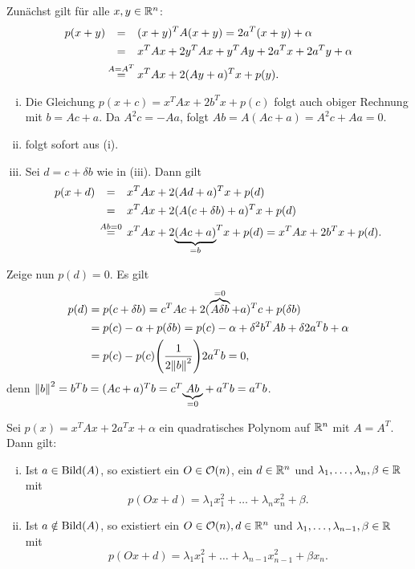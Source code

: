 \begin{beweis}
	Zunächst gilt für alle $x,y\in \mathbb{R}^n$:
	\begin{align*}
		p(x+y) &\stack{}{=} (x+y)^T A (x+y) = 2a^T(x+y) + \alpha \\
		&\stack{}{=} x^T Ax + 2y^T Ax + y^T Ay + 2a^Tx + 2a^Ty + \alpha \\
		&\stack{A=A^T}{=} x^TAx + 2(Ay + a)^Tx + p(y).
	\end{align*}
	\begin{enumerate}[(i)]
		\item Die Gleichung $p(x+c) = x^TAx + 2b^Tx + p(c)$ folgt auch obiger Rechnung mit $b = Ac+a$.
		Da $A^2c = -Aa$, folgt $Ab = A(Ac + a) = A^2c + Aa = 0$.
		\item folgt sofort aus (i).
		\item Sei $d = c + \delta b$ wie in (iii).
		Dann gilt
		\begin{align*}
			p(x+d)& \stack{}{=} x^TAx + 2(Ad+a)^T x + p(d) \\
			&\stack{}{=} x^TAx + 2(A(c+\delta b) + a)^T x + p(d) \\
			&\stack{Ab=0}{=} x^TAx + 2\Underbrace{(Ac+a)}{=b}^Tx + p(d) = x^TAx + 2b^Tx + p(d).
		\end{align*}
	\end{enumerate}
	Zeige nun $p(d) = 0$.
	Es gilt
	\begin{align*}
		p(d) &= p(c+\delta b) = c^TAc + 2(\overbrace{A\delta b}^{\mathclap{=0}}+a)^T c + p(\delta b) \\
		&= p(c) - \alpha + p(\delta b) = p(c) - \alpha + \delta^2 b^TAb + \delta 2 a^T b + \alpha \\
		&= p(c) - p(c) \enb{\frac{1}{2 \no{b}^2}} 2a^Tb = 0,
	\end{align*}
	denn $\left\lVert b\right\rVert^2 = b^Tb = (Ac+a)^Tb = c^T{\underbrace{Ab}_{=0}} + a^Tb = a^Tb$. \qedhere
\end{beweis}

\begin{satz}
	\label{satz:8.5}
	Sei $p(x) = x^TAx + 2a^Tx + \alpha$ ein quadratisches Polynom auf $\mathbb{R}^n$ mit $A = A^T$.
	Dann gilt:
	\begin{enumerate}[(i)]
		\item Ist $a \in \operatorname{Bild}(A)$, so existiert ein $O \in \mathcal{O}(n)$, ein $d \in \mathbb{R}^n$ und $\lambda_1,\dots,\lambda_n,\beta \in \mathbb{R}$ mit
		\[
			p(Ox + d) = \lambda_1 x_1^2 + \dots + \lambda_n x_n^2 + \beta.
		\]
		\item Ist $a \notin \operatorname{Bild}(A)$, so existiert ein $O \in \mathcal{O}(n), d \in \mathbb{R}^n$ und $\lambda_1,\dots,\lambda_{n-1},\beta \in \mathbb{R}$ mit
		\[
			p(Ox+d) = \lambda_1 x_1^2 + \dots + \lambda_{n-1} x_{n-1}^2 + \beta x_n.
		\]
	\end{enumerate}
\end{satz}

